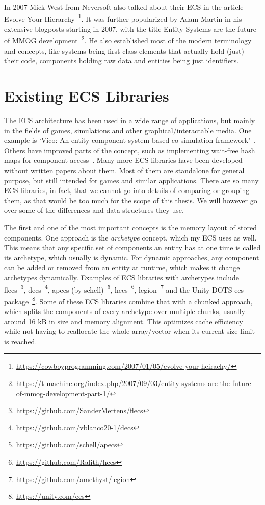 In 2007 Mick West from Neversoft also talked about their ECS in the article \textsf{Evolve Your Hierarchy}~\footnote{\url{https://cowboyprogramming.com/2007/01/05/evolve-your-heirachy/}}. It was further popularized by Adam Martin in his extensive blogposts starting in 2007, with the title \textsf{Entity Systems are the future of MMOG development}~\footnote{\url{https://t-machine.org/index.php/2007/09/03/entity-systems-are-the-future-of-mmog-development-part-1/}}. He also established most of the modern terminology and concepts, like systems being first-class elements that actually hold (just) their code, components holding raw data and entities being just identifiers.

\section{Existing ECS Libraries}

The ECS architecture has been used in a wide range of applications, but mainly in the fields of games, simulations and other graphical/interactable media. One example is `Vico: An entity-component-system based co-simulation framework'~\cite{hatledal2021vico}. Others have improved parts of the concept, such as implementing wait-free hash maps for component access~\cite{lange2016wait}. Many more ECS libraries have been developed without written papers about them. Most of them are standalone for general purpose, but still intended for games and similar applications. There are so many ECS libraries, in fact, that we cannot go into details of comparing or grouping them, as that would be too much for the scope of this thesis. We will however go over some of the differences and data structures they use.

The first and one of the most important concepts is the memory layout of stored components. One approach is the \textit{archetype} concept, which my ECS uses as well. This means that any specific set of components an entity has at one time is called its archetype, which usually is dynamic. For dynamic approaches, any component can be added or removed from an entity at runtime, which makes it change archetypes dynamically. Examples of ECS libraries with archetypes include \textsf{flecs}~\footnote{\url{https://github.com/SanderMertens/flecs}}, \textsf{decs}~\footnote{\url{https://github.com/vblanco20-1/decs}}, \textsf{apecs} (by schell)~\footnote{\url{https://github.com/schell/apecs}}, \textsf{hecs}~\footnote{\url{https://github.com/Ralith/hecs}}, \textsf{legion}~\footnote{\url{https://github.com/amethyst/legion}} and the Unity DOTS ecs package~\footnote{\url{https://unity.com/ecs}}. Some of these ECS libraries combine that with a chunked approach, which splits the components of every archetype over multiple chunks, usually around 16 kB in size and memory alignment. This optimizes cache efficiency while not having to reallocate the whole array/vector when its current size limit is reached.


